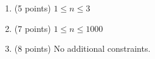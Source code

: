 \begin{enumerate}
    \tightlist
    \item (5 points) $1 \leq n \leq 3$
    \item (7 points) $1 \leq n \leq 1000$
    \item (8 points) No additional constraints.
\end{enumerate}
    